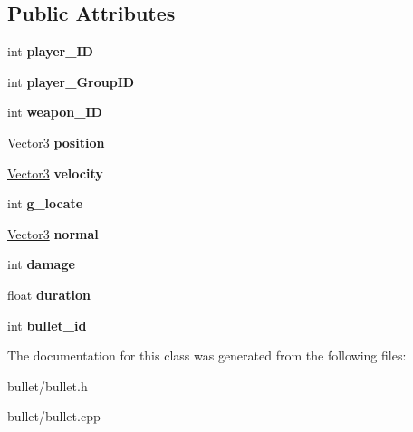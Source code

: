 \subsection*{Public Attributes}
\begin{DoxyCompactItemize}
\item 
\hypertarget{classbullet_add2a112f62d92f0c60ee54d1e08691f0}{int {\bfseries player\+\_\+\+I\+D}}\label{classbullet_add2a112f62d92f0c60ee54d1e08691f0}

\item 
\hypertarget{classbullet_a43c87295419c5a7e200fd716ffab0600}{int {\bfseries player\+\_\+\+Group\+I\+D}}\label{classbullet_a43c87295419c5a7e200fd716ffab0600}

\item 
\hypertarget{classbullet_a6ad2913adda12d30f6c3c475ebb837ad}{int {\bfseries weapon\+\_\+\+I\+D}}\label{classbullet_a6ad2913adda12d30f6c3c475ebb837ad}

\item 
\hypertarget{classbullet_a69a5b2d10e56bcf7cfd56709a8c786c6}{\hyperlink{class_vector3}{Vector3} {\bfseries position}}\label{classbullet_a69a5b2d10e56bcf7cfd56709a8c786c6}

\item 
\hypertarget{classbullet_a28ec7b4a5c1f696f6e8489e56b98e73c}{\hyperlink{class_vector3}{Vector3} {\bfseries velocity}}\label{classbullet_a28ec7b4a5c1f696f6e8489e56b98e73c}

\item 
\hypertarget{classbullet_a66193e40885c3ff276f8e4c39f8fad28}{int {\bfseries g\+\_\+locate}}\label{classbullet_a66193e40885c3ff276f8e4c39f8fad28}

\item 
\hypertarget{classbullet_a9e8de302d7ac3f104057d5b70936a025}{\hyperlink{class_vector3}{Vector3} {\bfseries normal}}\label{classbullet_a9e8de302d7ac3f104057d5b70936a025}

\item 
\hypertarget{classbullet_a778d9d2385d5533b6945520e262b9b2e}{int {\bfseries damage}}\label{classbullet_a778d9d2385d5533b6945520e262b9b2e}

\item 
\hypertarget{classbullet_a834b4f73596f3da7ceefd70d87e071cb}{float {\bfseries duration}}\label{classbullet_a834b4f73596f3da7ceefd70d87e071cb}

\item 
\hypertarget{classbullet_a99732e9e58f96991d769a11f3e0aa688}{int {\bfseries bullet\+\_\+id}}\label{classbullet_a99732e9e58f96991d769a11f3e0aa688}

\end{DoxyCompactItemize}


The documentation for this class was generated from the following files\+:\begin{DoxyCompactItemize}
\item 
bullet/bullet.\+h\item 
bullet/bullet.\+cpp\end{DoxyCompactItemize}
